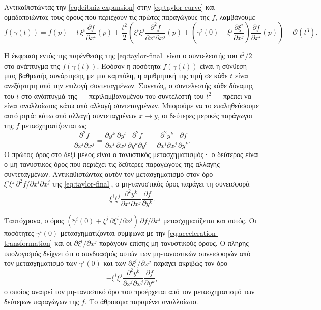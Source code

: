 \documentclass[11pt,a4paper,twoside,openright]{book}
\begin{document}
Αντικαθιστώντας την \eqref{eq:leibniz-expansion} στην \eqref{eq:taylor-curve} και ομαδοποιώντας τους όρους που περιέχουν τις πρώτες παραγώγους της $f$, λαμβάνουμε
\begin{equation}
f(\gamma(t)) = f(p) + t \, \xi^i \frac{\partial f}{\partial x^i}(p) + \frac{t^2}{2} \left( \xi^i \xi^j \frac{\partial^2 f}{\partial x^i \partial x^j}(p) + \left( \ddot{\gamma}^i(0) + \xi^j \frac{\partial \xi^i}{\partial x^j} \right) \frac{\partial f}{\partial x^i}(p) \right) + \mathcal{O}(t^3).
\label{eq:taylor-final}
\end{equation}

Η έκφραση εντός της παρένθεσης της \eqref{eq:taylor-final} είναι ο συντελεστής του $t^2/2$ στο ανάπτυγμα της $f(\gamma(t))$. Εφόσον η ποσότητα $f(\gamma(t))$ είναι η σύνθεση μιας βαθμωτής συνάρτησης με μια καμπύλη, η αριθμητική της τιμή σε κάθε $t$ είναι ανεξάρτητη από την επιλογή συντεταγμένων. Συνεπώς, ο συντελεστής κάθε δύναμης του $t$ στο ανάπτυγμά της --- περιλαμβανομένου του συντελεστή του $t^2$ --- πρέπει να είναι αναλλοίωτος κάτω από αλλαγή συντεταγμένων. Μπορούμε να το επαληθεύσουμε αυτό ρητά: κάτω από αλλαγή συντεταγμένων $x \to y$, οι δεύτερες μερικές παράγωγοι της $f$ μετασχηματίζονται ως
\begin{equation}
\frac{\partial^2 f}{\partial x^i \partial x^j} = \frac{\partial y^k}{\partial x^i} \frac{\partial y^l}{\partial x^j} \frac{\partial^2 f}{\partial y^k \partial y^l} + \frac{\partial^2 y^k}{\partial x^i \partial x^j} \frac{\partial f}{\partial y^k}.
\label{eq:second-derivative-transformation}
\end{equation}
Ο πρώτος όρος στο δεξί μέλος είναι ο τανυστικός μετασχηματισμός· ο δεύτερος είναι ο μη-τανυστικός όρος που περιέχει τις δεύτερες παραγώγους της αλλαγής συντεταγμένων. Αντικαθιστώντας αυτόν τον μετασχηματισμό στον όρο $\xi^i \xi^j \, \partial^2 f / \partial x^i \partial x^j$ της \eqref{eq:taylor-final}, ο μη-τανυστικός όρος παράγει τη συνεισφορά
\begin{equation}
\xi^i \xi^j \frac{\partial^2 y^k}{\partial x^i \partial x^j} \frac{\partial f}{\partial y^k}.
\end{equation}

Ταυτόχρονα, ο όρος $(\ddot{\gamma}^i(0) + \xi^j \, \partial \xi^i / \partial x^j) \, \partial f / \partial x^i$ μετασχηματίζεται και αυτός. Οι ποσότητες $\ddot{\gamma}^i(0)$ μετασχηματίζονται σύμφωνα με την \eqref{eq:acceleration-transformation} και οι $\partial \xi^i / \partial x^j$ παράγουν επίσης μη-τανυστικούς όρους. Ο πλήρης υπολογισμός δείχνει ότι ο συνδυασμός αυτών των μη-τανυστικών συνεισφορών από τον μετασχηματισμό των $\ddot{\gamma}^i(0)$ και των $\partial \xi^i / \partial x^j$ παράγει ακριβώς τον όρο
\begin{equation}
- \xi^i \xi^j \frac{\partial^2 y^k}{\partial x^i \partial x^j} \frac{\partial f}{\partial y^k},
\end{equation}
ο οποίος αναιρεί τον μη-τανυστικό όρο που προέρχεται από τον μετασχηματισμό των δεύτερων παραγώγων της $f$. Το άθροισμα παραμένει αναλλοίωτο.
\end{document}
